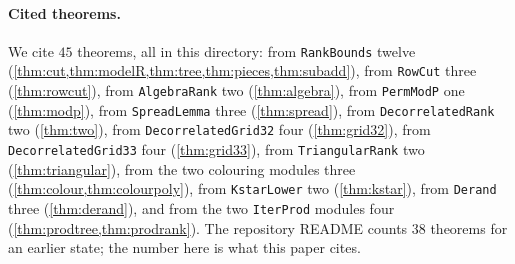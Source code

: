\documentclass[10pt]{amsart}
\theoremstyle{plain}
\theoremstyle{definition}
\theoremstyle{remark}
\numberwithin{equation}{section}
\begin{document}
\paragraph{Cited theorems.} We cite $45$ theorems, all in this directory: from \texttt{RankBounds}
twelve (\cref{thm:cut,thm:modelR,thm:tree,thm:pieces,thm:subadd}), from \texttt{RowCut} three
(\cref{thm:rowcut}), from \texttt{AlgebraRank} two (\cref{thm:algebra}), from \texttt{PermModP} one
(\cref{thm:modp}), from \texttt{SpreadLemma} three (\cref{thm:spread}), from \texttt{DecorrelatedRank} two
(\cref{thm:two}), from \texttt{DecorrelatedGrid32} four (\cref{thm:grid32}), from
\texttt{DecorrelatedGrid33} four (\cref{thm:grid33}), from \texttt{TriangularRank} two
(\cref{thm:triangular}), from the two colouring modules three (\cref{thm:colour,thm:colourpoly}), from
\texttt{KstarLower} two (\cref{thm:kstar}), from \texttt{Derand} three (\cref{thm:derand}), and from the two
\texttt{IterProd} modules four (\cref{thm:prodtree,thm:prodrank}). The repository README counts $38$
theorems for an earlier state; the number here is what this paper cites.
\end{document}
